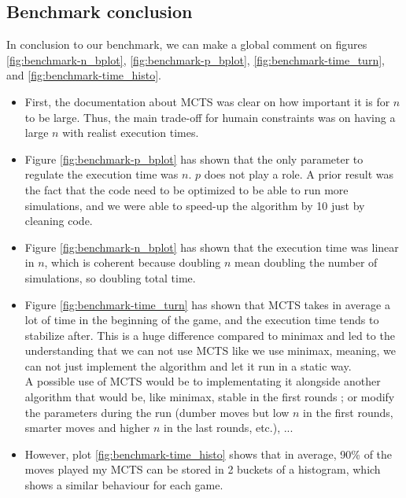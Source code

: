 \subsection{Benchmark conclusion}\label{subsection:benchmark-conclusion}
In conclusion to our benchmark, we can make a global comment on figures \ref{fig:benchmark-n_bplot}, \ref{fig:benchmark-p_bplot}, \ref{fig:benchmark-time_turn}, and \ref{fig:benchmark-time_histo}.

\begin{itemize}[label=$\blacktriangleright$]
    \item First, the documentation about MCTS was clear on how important it is for $n$ to be large. Thus, the main trade-off for humain constraints was on having a large $n$ with realist execution times.
    \item Figure \ref{fig:benchmark-p_bplot} has shown that the only parameter to regulate the execution time was $n$. $p$ does not play a role. A prior result was the fact that the code need to be optimized to be able to run more simulations, and we were able to speed-up the algorithm by 10 just by cleaning code.
    \item Figure \ref{fig:benchmark-n_bplot} has shown that the execution time was linear in $n$, which is coherent because doubling $n$ mean doubling the number of simulations, so doubling total time. 
    \item Figure \ref{fig:benchmark-time_turn} has shown that MCTS takes in average a lot of time in the beginning of the game, and the execution time tends to stabilize after. This is a huge difference compared to minimax and led to the understanding that we can not use MCTS like we use minimax, meaning, we can not just implement the algorithm and let it run in a static way. \\
    
    A possible use of MCTS would be to implementating it alongside another algorithm that would be, like minimax, stable in the first rounds ; or modify the parameters during the run (dumber moves but low $n$ in the first rounds, smarter moves and higher $n$ in the last rounds, etc.), ... 

    \item However, plot \ref{fig:benchmark-time_histo} shows that in average, 90\% of the moves played my MCTS can be stored in 2 buckets of a histogram, which shows a similar behaviour for each game.
\end{itemize}
